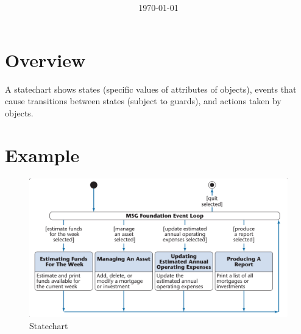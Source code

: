 \documentclass[11pt]{article}
\title{\textbf{\Topic}}
\author{\Name}
\date{\today}
\begin{document}
\maketitle
\noindent\makebox[\linewidth]{\rule[8pt]{5in}{0.5pt}}

\section*{Overview}

A statechart shows states (specific values of attributes of objects), events that cause transitions between states (subject to guards), and actions taken by objects.

\section*{Example}

\begin{figure}[h]
	\centering
	\includegraphics[width=0.9\linewidth]{images/Statechart.png}
	\caption{Statechart}
	\label{fig:Statechart}
\end{figure}
\end{document}
